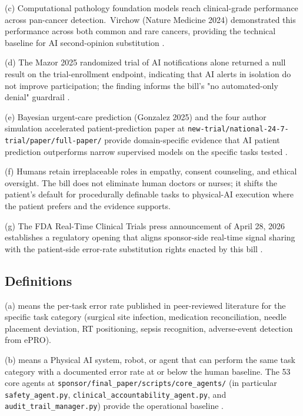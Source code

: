 (c) Computational pathology foundation models reach clinical-grade
performance across pan-cancer detection.\ Virchow (Nature Medicine
2024) demonstrated this performance across both common and rare
cancers, providing the technical baseline for AI second-opinion
substitution \cite{vorontsov2024virchow}.

(d) The Mazor 2025 randomized trial of AI notifications alone
returned a null result on the trial-enrollment endpoint, indicating
that AI alerts in isolation do not improve participation; the
finding informs the bill's "no automated-only denial" guardrail
\cite{mazor2025ai_notifications_trial}.

(e) Bayesian urgent-care prediction (Gonzalez 2025) and the four author
simulation accelerated patient-prediction paper at
\texttt{new-trial/national-24-7-trial/paper/full-paper/} provide
domain-specific evidence that AI patient prediction outperforms
narrow supervised models on the specific tasks tested
\cite{gonzalez2025bayesian_urgent_care_nsclc, kawchak_2026_19994945}.

(f) Humans retain irreplaceable roles in empathy, consent
counseling, and ethical oversight. The bill does not eliminate human
doctors or nurses; it shifts the patient's default for procedurally
definable tasks to physical-AI execution where the patient prefers
and the evidence supports.

(g) The FDA Real-Time Clinical Trials press announcement of April
28, 2026 establishes a regulatory opening that aligns sponsor-side
real-time signal sharing with the patient-side error-rate
substitution rights enacted by this bill \cite{fda_rtct_press_2026}.

\subsection{Definitions}

\hspace{0.5cm} (a)  means the per-task error
rate published in peer-reviewed literature for the specific task
category (surgical site infection, medication reconciliation,
needle placement deviation, RT positioning, sepsis recognition,
adverse-event detection from ePRO).

(b)  means a Physical AI system,
robot, or agent that can perform the same task category with a
documented error rate at or below the human baseline. The 53 core
agents at \texttt{sponsor/final\_paper/scripts/core\_agents/} (in
particular \texttt{safety\_agent.py},
\texttt{clinical\_accountability\_agent.py}, and
\texttt{audit\_trail\_manager.py}) provide the operational baseline
\cite{kawchak_2026_19396256}.

